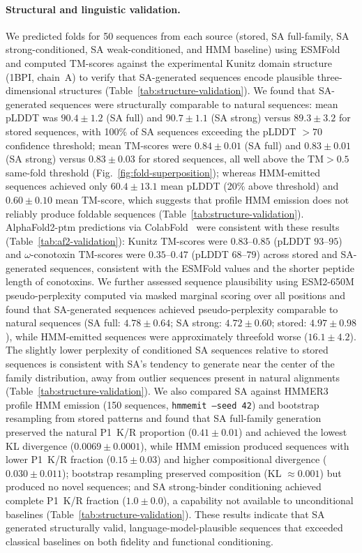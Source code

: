\paragraph{Structural and linguistic validation.}
We predicted folds for 50 sequences from each source (stored, SA full-family, SA
strong-conditioned, SA weak-conditioned, and HMM baseline) using ESMFold and computed TM-scores
against the experimental Kunitz domain structure (1BPI, chain~A) to verify that SA-generated
sequences encode plausible three-dimensional structures
(Table~\ref{tab:structure-validation}). We found that
SA-generated sequences were structurally comparable to natural sequences: mean pLDDT
was $90.4 \pm 1.2$ (SA full) and $90.7 \pm 1.1$ (SA strong) versus $89.3 \pm 3.2$ for stored
sequences, with 100\% of SA sequences exceeding the pLDDT $>70$ confidence threshold; mean
TM-scores were $0.84 \pm 0.01$ (SA full) and $0.83 \pm 0.01$ (SA strong) versus
$0.83 \pm 0.03$ for stored sequences, all well above the $\mathrm{TM} > 0.5$ same-fold
threshold (Fig.~\ref{fig:fold-superposition}); whereas HMM-emitted sequences achieved only $60.4 \pm 13.1$ mean pLDDT (20\% above
threshold) and $0.60 \pm 0.10$ mean TM-score, which suggests that profile HMM emission does not
reliably produce foldable sequences (Table~\ref{tab:structure-validation}). AlphaFold2-ptm predictions via ColabFold~\cite{jumperHighlyAccurate2021,mirdita2022colabfold} were consistent with these results (Table~\ref{tab:af2-validation}): Kunitz TM-scores were $0.83$--$0.85$ (pLDDT $93$--$95$) and $\omega$-conotoxin TM-scores were $0.35$--$0.47$ (pLDDT $68$--$79$) across stored and SA-generated sequences, consistent with the ESMFold values and the shorter peptide length of conotoxins. We further assessed
sequence plausibility using ESM2-650M pseudo-perplexity computed via masked marginal scoring
over all positions and found that SA-generated sequences achieved pseudo-perplexity comparable
to natural sequences (SA full: $4.78 \pm 0.64$; SA strong: $4.72 \pm 0.60$; stored:
$4.97 \pm 0.98$), while HMM-emitted sequences were approximately threefold worse
($16.1 \pm 4.2$). The slightly lower perplexity of conditioned SA sequences relative
to stored sequences is consistent with SA's tendency to generate near the center of the family
distribution, away from outlier sequences present in natural alignments
(Table~\ref{tab:structure-validation}). We also compared SA against HMMER3~\cite{hmmer3} profile HMM emission
(150 sequences, \texttt{hmmemit --seed 42}) and bootstrap resampling from stored patterns and
found that SA full-family generation preserved the natural P1~K/R proportion
($0.41 \pm 0.01$) and achieved the lowest KL divergence ($0.0069 \pm 0.0001$), while HMM
emission produced sequences with lower P1~K/R fraction ($0.15 \pm 0.03$) and
higher compositional divergence ($0.030 \pm 0.011$); bootstrap resampling preserved
composition (KL $\approx 0.001$) but produced no novel sequences; and SA strong-binder
conditioning achieved complete P1~K/R fraction ($1.0 \pm 0.0$), a capability
not available to unconditional baselines (Table~\ref{tab:structure-validation}). These results
indicate that SA generated structurally valid, language-model-plausible sequences that
exceeded classical baselines on both fidelity and functional conditioning.
